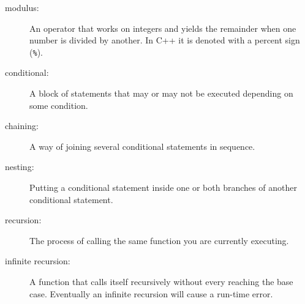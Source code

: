 \begin{description}

\item[modulus:]  An operator that works on integers and yields
the remainder when one number is divided by another.  In C++
it is denoted with a percent sign ({\tt \%}).

\item[conditional:]  A block of statements that may or may not
be executed depending on some condition.

\item[chaining:]  A way of joining several conditional statements
in sequence.

\item[nesting:] Putting a conditional statement inside one or both
branches of another conditional statement.

\item[recursion:]  The process of calling the same function you
are currently executing.

\item[infinite recursion:]  A function that calls itself
recursively without every reaching the base case.  Eventually
an infinite recursion will cause a run-time error.


\end{description}


